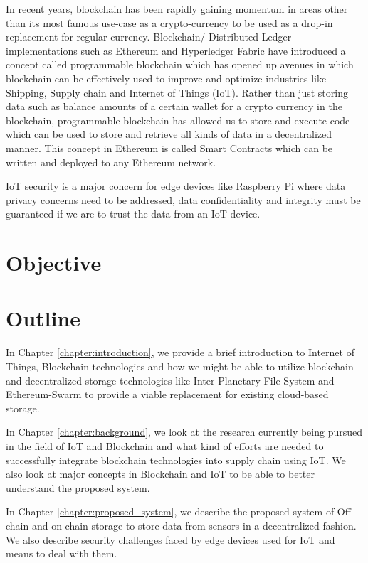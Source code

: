 \documentclass[11pt,openright]{report}
\begin{document}
In recent years, blockchain has been rapidly gaining momentum in areas other than its most famous use-case as a crypto-currency to be used as a drop-in replacement for regular currency. Blockchain/ Distributed Ledger implementations such as Ethereum and Hyperledger Fabric have introduced a concept called programmable blockchain which has opened up avenues in which blockchain can be effectively used to improve and optimize industries like Shipping, Supply chain and Internet of Things (IoT). Rather than just storing data such as balance amounts of a certain wallet for a crypto currency in the blockchain, programmable blockchain has allowed us to store and execute code which can be used to store and retrieve all kinds of data in a decentralized manner. This concept in Ethereum is called Smart Contracts which can be written and deployed to any Ethereum network.

IoT security is a major concern for edge devices like Raspberry Pi where data privacy concerns need to be addressed, data confidentiality and integrity must be guaranteed if we are to trust the data from an IoT device. 


\section{Objective}\label{section:objective}


\section{Outline}\label{section:outline}

In Chapter \ref{chapter:introduction}, we provide a brief introduction to Internet of Things, Blockchain technologies and how we might be able to utilize blockchain and decentralized storage technologies like Inter-Planetary File System and Ethereum-Swarm to provide a viable replacement for existing cloud-based storage.\newline

\noindent In Chapter \ref{chapter:background}, we look at the research currently being pursued in the field of IoT and Blockchain and what kind of efforts are needed to successfully integrate blockchain technologies into supply chain using IoT. We also look at major concepts in Blockchain and IoT to be able to better understand the proposed system.\newline

\noindent In Chapter \ref{chapter:proposed_system}, we describe the proposed system of Off-chain and on-chain storage to store data from sensors in a decentralized fashion. We also describe security challenges faced by edge devices used for IoT and means to deal with them.\newline
\end{document}

